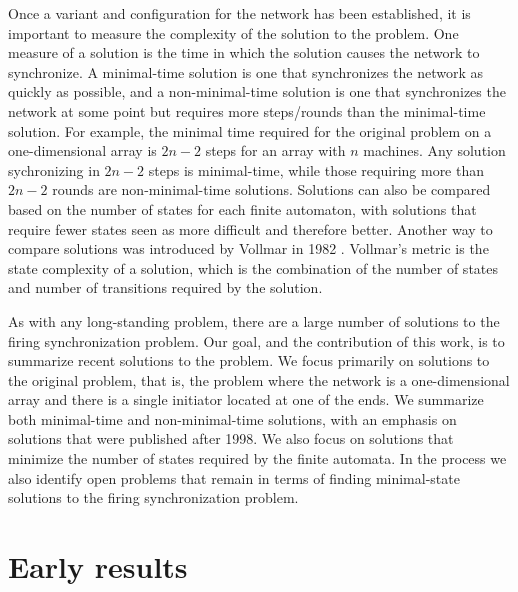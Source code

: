 \documentclass{article}
\begin{document}
Once a variant and configuration for the network has been established, it is important to measure the complexity of the solution to the problem. One measure of a solution is the time in which the solution causes the network to synchronize. A minimal-time solution is one that synchronizes the network as quickly as possible, and a non-minimal-time solution is one that synchronizes the network at some point but requires more steps/rounds than the minimal-time solution. For example, the minimal time required for the original problem on a one-dimensional array is $2n - 2$ steps for an array with $n$ machines. Any solution sychronizing in $2n - 2$ steps is minimal-time, while those requiring more than $2n - 2$ rounds are non-minimal-time solutions. Solutions can also be compared based on the number of states for each finite automaton, with solutions that require fewer states seen as more difficult and therefore better. Another way to compare solutions was introduced by Vollmar in 1982 \cite{vollmar1982some}. Vollmar's metric is the state complexity of a solution, which is the combination of the number of states and number of transitions required by the solution.

As with any long-standing problem, there are a large number of solutions to the firing synchronization problem. Our goal, and the contribution of this work, is to summarize recent solutions to the problem. We focus primarily on solutions to the original problem, that is, the problem where the network is a one-dimensional array and there is a single initiator located at one of the ends. We summarize both minimal-time and non-minimal-time solutions, with an emphasis on solutions that were published after 1998. We also focus on solutions that minimize the number of states required by the finite automata. In the process we also identify open problems that remain in terms of finding minimal-state solutions to the firing synchronization problem.
    
\section{Early results}


\end{document}
